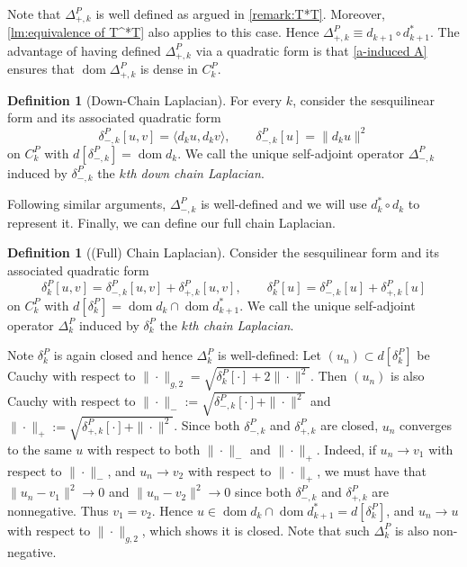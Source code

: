\documentclass[11pt]{article}
\theoremstyle{definition}
\newtheorem{definition}[theorem]{Definition}
\theoremstyle{remark}
\DeclareMathOperator\dom{dom}
\begin{document}
Note that $\Delta_{+,k}^P$ is well defined as argued in \cref{remark:T*T}. Moreover, \cref{lm:equivalence of T^*T} also applies to this case. Hence $\Delta^P_{+,k}\equiv d_{k+1}\circ d^*_{k+1}$. The advantage of having defined $\Delta^P_{+,k}$ via a quadratic form is that \cref{a-induced A} ensures that $\dom \Delta^P_{+,k}$ is dense in $C_k^P$.

\begin{definition}[Down-Chain Laplacian]\label{def:kth down chain laplacian}
    For every $k$, consider the sesquilinear form and its associated quadratic form $$\delta^P_{-,k}[u,v]=\langle d_{k}u,d_{k}v\rangle,\qquad \delta_{-,k}^P[u]=\|d_{k}u\|^2$$ on $C_k^P$ with $d[\delta^P_{-,k}]=\dom d_{k}$. We call the unique self-adjoint operator $\Delta_{-,k}^P$ induced by $\delta^P_{-,k}$ the \textit{$k$th down chain Laplacian}. 
\end{definition}
Following similar arguments, $\Delta_{-,k}^P$ is well-defined and we will use $d_k^*\circ d_k$ to represent it. Finally, we can define our full chain Laplacian.

\begin{definition}[(Full) Chain Laplacian]
\label{def:kth chain Laplacian}
    Consider the sesquilinear form and its associated quadratic form
$$
\delta^P_k[u,v]=\delta_{-,k}^P[u,v]+\delta_{+,k}^P[u,v], \qquad \delta^P_k[u]=\delta_{-,k}^P[u]+\delta_{+,k}^P[u]
$$
on $C^P_k$ with $d[\delta^P_k]=\dom d_k\cap\dom d_{k+1}^*$. We call the unique self-adjoint operator $\Delta^P_k$ induced by $\delta^P_k$ the \textit{$k$th chain Laplacian}.
\end{definition}

Note $\delta^P_k$ is again closed and hence $\Delta^P_k$ is well-defined: Let $(u_n)\subset d[\delta^P_k]$ be Cauchy with respect to $\|\cdot\|_{g,2}=\sqrt{\delta^P_k[\cdot]+2\|\cdot\|^2}$. Then $(u_n)$ is also Cauchy with respect to $\|\cdot\|_-:=\sqrt{\delta^P_{-,k}[\cdot]+\|\cdot\|^2}$ and $\|\cdot\|_+:=\sqrt{\delta^P_{+,k}[\cdot]+\|\cdot\|^2}$. Since both $\delta_{-,k}^P$ and $\delta_{+,k}^P$ are closed, $u_n$ converges to the same $u$ with respect to both $\|\cdot\|_-$ and $\|\cdot\|_+$. Indeed, if $u_n\to v_1$ with respect to $\|\cdot\|_-$, and $u_n\to v_2$ with respect to $\|\cdot\|_+$, we must have that $\|u_n-v_1\|^2\to 0$ and $\|u_n-v_2\|^2\to 0$ since both $\delta_{-,k}^P$ and $\delta_{+,k}^P$ are nonnegative. Thus $v_1=v_2$. Hence $u\in\dom d_k\cap\dom d_{k+1}^*=d[\delta^P_k]$, and $u_n\to u$ with respect to $\|\cdot\|_{g,2}$, which shows it is closed. Note that such $\Delta^P_k$ is also non-negative. 
\end{document}

